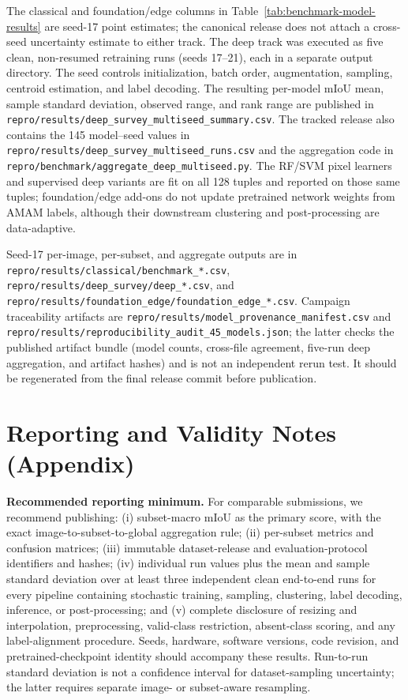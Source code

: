 \documentclass{article}
\newcommand{\paircount}{128}
\begin{document}
The classical and foundation/edge columns in
Table~\ref{tab:benchmark-model-results} are seed-17 point estimates; the
canonical release does not attach a cross-seed uncertainty estimate to either
track. The deep track was executed as five clean, non-resumed retraining runs
(seeds 17--21), each in a separate output directory. The seed controls
initialization, batch order, augmentation, sampling, centroid estimation, and
label decoding. The resulting per-model mIoU mean, sample standard deviation,
observed range, and rank range are published in
\texttt{repro/results/deep\_survey\_multiseed\_summary.csv}. The tracked
release also contains the 145 model--seed values in
\texttt{repro/results/deep\_survey\_multiseed\_runs.csv} and the aggregation
code in \texttt{repro/benchmark/aggregate\_deep\_multiseed.py}. The
RF/SVM pixel learners and supervised deep variants are fit on all
\paircount{} tuples and reported on those same tuples; foundation/edge add-ons
do not update pretrained network weights from AMAM labels, although their
downstream clustering and post-processing are data-adaptive.

Seed-17 per-image, per-subset, and aggregate outputs are in
\texttt{repro/results/classical/benchmark\_*.csv},
\texttt{repro/results/deep\_survey/deep\_*.csv}, and
\texttt{repro/results/foundation\_edge/foundation\_edge\_*.csv}. Campaign
traceability artifacts are
\texttt{repro/results/model\_provenance\_manifest.csv} and
\texttt{repro/results/reproducibility\_audit\_45\_models.json}; the latter
checks the published artifact bundle (model counts, cross-file agreement,
five-run deep aggregation, and artifact hashes) and is not an independent
rerun test.
It should be regenerated from the final release commit before publication.


\section{Reporting and Validity Notes (Appendix)}\label{app:validity}
\textbf{Recommended reporting minimum.} For comparable submissions, we
recommend publishing: (i) subset-macro mIoU as the primary score, with the
exact image-to-subset-to-global aggregation rule; (ii) per-subset metrics and
confusion matrices; (iii) immutable dataset-release and evaluation-protocol
identifiers and hashes; (iv) individual run values plus the mean and sample
standard deviation over at least three independent clean end-to-end runs for
every pipeline containing stochastic training, sampling, clustering, label
decoding, inference, or post-processing; and (v) complete disclosure of
resizing and interpolation, preprocessing, valid-class restriction,
absent-class scoring, and any label-alignment procedure. Seeds, hardware,
software versions, code revision, and pretrained-checkpoint identity should
accompany these results. Run-to-run standard deviation is not a confidence
interval for dataset-sampling uncertainty; the latter requires separate
image- or subset-aware resampling.
\end{document}
